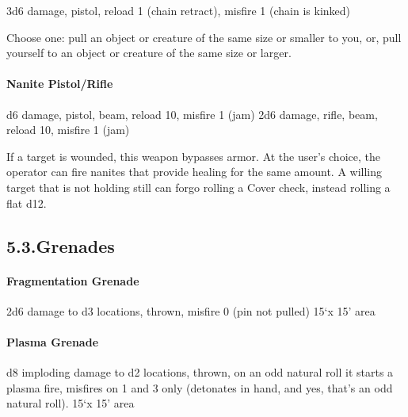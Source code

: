 \documentclass{article}
\begin{document}
\noindent{}3d6 damage, pistol, reload 1 (chain retract), misfire 1 (chain is kinked)%

Choose one: pull an object or creature of the same size or smaller to you, or, pull yourself to an object or creature of the same size or larger.%

\paragraph{Nanite Pistol/Rifle}\label{sec-nanite-pistolrifle}%

\noindent{}d6 damage, pistol, beam, reload 10, misfire 1 (jam)\mdbr
{}2d6 damage, rifle, beam, reload 10, misfire 1 (jam)%

If a target is wounded, this weapon bypasses armor. At the user's choice, the operator can fire nanites that provide healing for the same amount. A willing target that is not holding still can forgo rolling a Cover check, instead rolling a flat d12.%

\subsection{5.3.\hspace*{0.5em}Grenades}\label{sec-grenades}%

\paragraph{Fragmentation Grenade}\label{sec-fragmentation-grenade}%

\noindent{}2d6 damage to d3 locations, thrown, misfire 0 (pin not pulled) 15\textquoteleft{}x 15\textquoteright{} area%

\paragraph{Plasma Grenade}\label{sec-plasma-grenade}%

\noindent{}d8 imploding damage to d2 locations, thrown, on an odd natural roll it starts a plasma fire, misfires on 1 and 3 only (detonates in hand, and yes, that's an odd natural roll). 15\textquoteleft{}x 15\textquoteright{} area%
\end{document}
